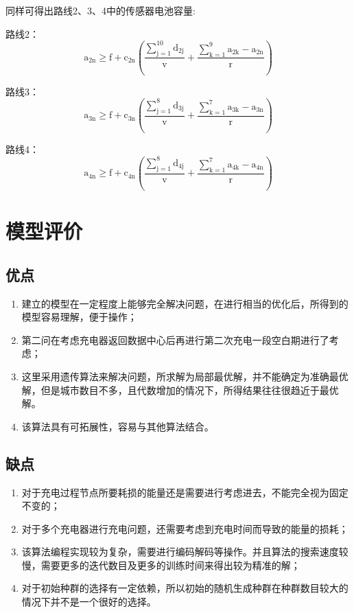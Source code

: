 \documentclass{article}
\begin{document}
同样可得出路线2、3、4中的传感器电池容量:

路线2：
\begin{equation}
    \mathrm{a_{2 n} \geqslant f+c_{2 n}\left(\frac{\sum_{j=1}^{10} d_{2 j}}{v}+\frac{\sum_{k=1}^{9} a_{2 k}-a_{2 n}}{r}\right)} 
    \tag{31}
\end{equation}

路线3：
\begin{equation}
    \mathrm{a_{3 n} \geqslant f+c_{3 n}\left(\frac{\sum_{j=1}^{8} d_{3 j}}{v}+\frac{\sum_{k=1}^{7} a_{3 k}-a_{3 n}}{r}\right)} 
    \tag{32}
\end{equation}

路线4：
\begin{equation}
    \mathrm{a_{4 n} \geqslant f+c_{4 n}\left(\frac{\sum_{j=1}^{8} d_{4 j}}{v}+\frac{\sum_{k=1}^{7} a_{4 k}-a_{4 n}}{r}\right)} 
    \tag{33}
\end{equation}
\newpage          
\section{模型评价}
\subsection{优点}
\begin{enumerate}[(1)]          %
    \item 建立的模型在一定程度上能够完全解决问题，在进行相当的优化后，所得到的模型容易理解，便于操作；
    \item 第二问在考虑充电器返回数据中心后再进行第二次充电一段空白期进行了考虑；
    \item 这里采用遗传算法来解决问题，所求解为局部最优解，并不能确定为准确最优解，但是城市数目不多，且代数增加的情况下，所得结果往往很趋近于最优解。
    \item 该算法具有可拓展性，容易与其他算法结合。
\end{enumerate}

\subsection{缺点}
\begin{enumerate}[(1)] 
    \item 对于充电过程节点所要耗损的能量还是需要进行考虑进去，不能完全视为固定不变的；
    \item 对于多个充电器进行充电问题，还需要考虑到充电时间而导致的能量的损耗；
    \item 该算法编程实现较为复杂，需要进行编码解码等操作。并且算法的搜索速度较慢，需要更多的迭代数目及更多的训练时间来得出较为精准的解；
    \item 对于初始种群的选择有一定依赖，所以初始的随机生成种群在种群数目较大的情况下并不是一个很好的选择。
\end{enumerate}
\end{document}
